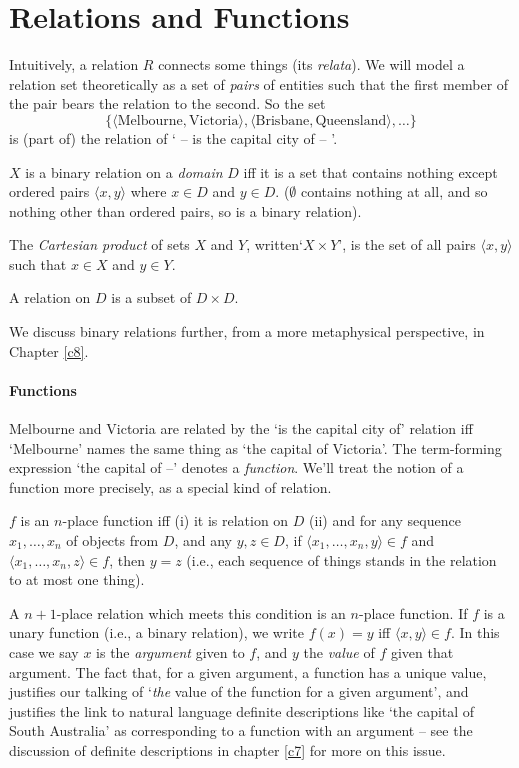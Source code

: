 \section{Relations and Functions}
Intuitively, a relation $R$ connects some things (its \emph{relata}). We will model a relation set theoretically as a set of \emph{pairs} of entities such that the first member of the pair bears the relation to the second.  So the set $$\{\langle \text{Melbourne},\text{Victoria}\rangle, \langle \text{Brisbane},\text{Queensland}\rangle,\ldots\}$$ is (part of) the relation of ` –  is the capital city of  – '.

\begin{definition}
	$X$ is a binary relation on a \emph{domain} $D$ iff it is a set that contains nothing except ordered pairs $\langle x,y\rangle$ where $x \in D$ and $y\in D$. ($\emptyset$ contains nothing at all, and so nothing other than ordered pairs, so is a binary relation).
\end{definition}



\begin{definition}
	The \emph{Cartesian product} of sets $X$ and 
	$Y$, written‘$X \times Y$’, is the set of all pairs $\langle x,y\rangle$
	such that $x \in X$ and $y \in Y$.
\end{definition} A relation on $D$ is a subset of $D \times D$.

We discuss binary relations further, from a more metaphysical perspective, in Chapter \ref{c8}.

\paragraph{Functions}

Melbourne and Victoria are related by the `is the capital city of' relation iff `Melbourne' names the same thing as `the capital of Victoria'. The term-forming expression `the capital of  –' denotes a \emph{function}. We'll treat the notion of a function more precisely, as a special kind of relation.

\begin{definition}[Function]
	$f$ is an $n$-place function iff (i) it is relation on $D$ (ii) and for any sequence $x_{1},\ldots,x_{n}$ of objects from $D$, and any $y,z \in D$, if $\langle x_{1},\ldots,x_{n},y\rangle \in f$ and $\langle x_{1},\ldots,x_{n},z\rangle \in f$, then $y=z$ (i.e., each sequence of things stands in the relation to at most one thing). 
\end{definition}
 A $n+1$-place relation which meets this condition is an $n$-place function.
If $f$ is a unary function (i.e., a binary relation), we write $f(x) = y$ iff $\langle x,y\rangle \in f$. In this case we say $x$ is the \emph{argument} given to $f$, and $y$ the \emph{value} of $f$ given that argument. The fact that, for a given argument, a function has a unique value, justifies our talking of `\emph{the} value of the function for a given argument', and justifies the link to natural language definite descriptions like `the capital of South Australia' as corresponding to a function with an argument – see the discussion of definite descriptions in chapter \ref{c7} for more on this issue.

